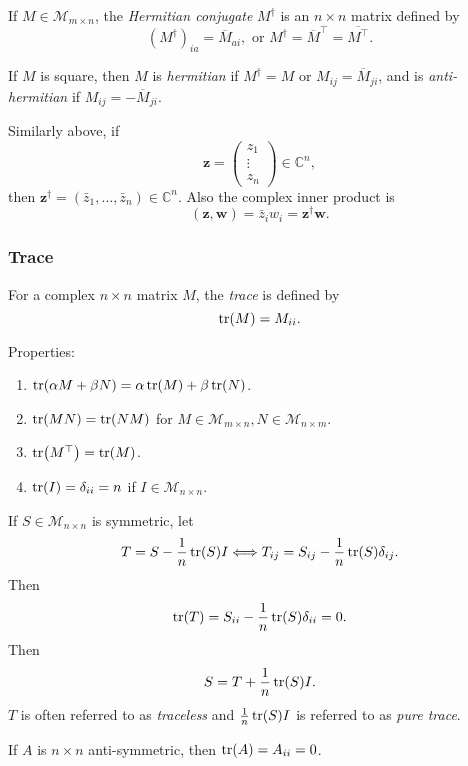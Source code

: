 \documentclass[a4paper]{article}
\begin{document}
    \begin{definition}
      If $ M\in \mathcal{M}_{m\times n} $, the \textit{Hermitian
      conjugate} $ M^\dagger  $ is an $n\times n$ matrix defined by
      \[
        (M^\dagger )_{ia}=\overline{M}_{ai}, \text{ or } M^\dagger
        =\overline{M}^{\top}=\overline{M^{\top}}
      .\]

      If $M$ is square, then $M$ is \textit{hermitian} if $ M^\dagger
      =M $ or $ M_{ij}=\overline{M}_{ji} $, and is
      \textit{anti-hermitian} if $ M_{ij}=-\overline{M}_{ji} $.
    \end{definition}
    Similarly above, if
    \[
      \mathbf{z}=
      \begin{pmatrix}
        z_1\\\vdots\\z_n
      \end{pmatrix}\in \mathbb{C}^{n},
    \]
    then $ \mathbf{z}^\dagger = (\bar{z}_1,\dots, \bar{z}_n)\in
    \mathbb{C}^{n} $. Also the complex inner product is
    \[
      (\mathbf{z},\mathbf{w})=\bar{z}_i w_i=\mathbf{z}^\dagger \mathbf{w}
    .\]
    \subsubsection{Trace}
    \begin{definition}
      For a complex $ n \times n $ matrix $M$, the \textit{trace} is defined by
      \[
        \trace(M)=M_{ii}
      .\]
    \end{definition}
    Properties:
    \begin{enumerate}
      \item $ \tr(\alpha M+ \beta N)=\alpha \tr(M)+\beta \tr(N) $.
      \item $ \tr(MN)=\tr(NM) $ for $ M\in \mathcal{M}_{m\times n},
        N\in \mathcal{M}_{n\times m} $.
      \item $ \tr(M^{\top})=\tr(M) $.
      \item $ \tr(I)=\delta_{ii}=n $ if $ I\in \mathcal{M}_{n\times n} $.
    \end{enumerate}
    If $ S\in \mathcal{M}_{n\times n} $ is symmetric, let
    \[
      T=S-\frac{1}{n}\tr(S)I \Longleftrightarrow
      T_{ij}=S_{ij}-\frac{1}{n}\tr(S)\delta_{ij}
    .\]
    Then
    \[
      \tr(T)=S_{ii}-\frac{1}{n}\tr(S)\delta_{ii}=0
    .\]
    Then
    \[
      S=T+\frac{1}{n}\tr(S)I
    .\]
    $T$ is often referred to as \textit{traceless} and $
    \frac{1}{n}\tr(S)I $ is referred to as \textit{pure trace}.
    \begin{remark}
      If $A$ is $ n \times n $ anti-symmetric, then $ \tr(A)=A_{ii}=0 $.
    \end{remark}
\end{document}
